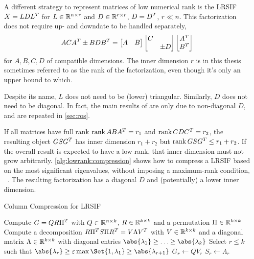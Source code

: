A different strategy to represent matrices of low numerical rank is the \ac{LRSIF} \cite{Benner2009,Lang2015}
$X = LDL^T$ for $L\in\mathbb{R}^{n\times r}$ and $D\in\mathbb{R}^{r \times r}$, $D=D^T$, $r\ll n$.
This factorization does not require up- and downdate to be handled separately,
\begin{equation}
  ACA^T \pm BDB^T =
  \begin{bmatrix}
    A & B
  \end{bmatrix}
  \begin{bmatrix}
    C \\ & \pm D
  \end{bmatrix}
  \begin{bmatrix}
    A^T \\ B^T
  \end{bmatrix}
\end{equation}
for $A, B, C, D$ of compatible dimensions.
The inner dimension $r$ is in this thesis sometimes referred to as the rank of the factorization,
even though it's only an upper bound to which.

\begin{remark}
  Despite its name, $L$ does not need to be (lower) triangular.
  Similarly, $D$ does not need to be diagonal.
  In fact, the main results of \cite{Lang2015} are only due to non-diagonal $D$,
  and are repeated in \autoref{sec:ros}.
\end{remark}

If all matrices have full rank $\operatorname{rank} ABA^T = r_1$ and $\operatorname{rank} CDC^T = r_2$,
the resulting object $GSG^T$ has inner dimension $r_1 + r_2$ but $\operatorname{rank} GSG^T \leq r_1 + r_2$.
If the overall result is expected to have a low rank,
that inner dimension must not grow arbitrarily.
\autoref{alg:lowrank:compression} shows how to compress a \ac{LRSIF}
based on the most significant eigenvalues,
without imposing a maximum-rank condition,
\cf~\cite[Section~6.3.3]{Lang2017}.
The resulting factorization has a diagonal $D$ and (potentially) a lower inner dimension.

\begin{algorithm}[h]
  \caption{Column Compression for LRSIF}
  \label{alg:lowrank:compression}
  Compute $G=QR\Pi^T$ with $Q\in\mathbb{R}^{n\times k}$, $R\in\mathbb{R}^{k\times k}$ and a permutation $\Pi\in\mathbb{R}^{k\times k}$\;
  Compute a decomposition $R \Pi^T S \Pi R^T = V \Lambda V^T$ with $V \in \mathbb{R}^{k\times k}$
  and a diagonal matrix $\Lambda\in\mathbb{R}^{k\times k}$ with diagonal entries $\abs{\lambda_1}\geq\ldots\geq\abs{\lambda_k}$\;
  Select $r \leq k$ such that $\abs{\lambda_r} \geq \epsilon\max\Set{1, \lambda_1} \geq \abs{\lambda_{r+1}}$\;
  $G_r \gets Q V_r$\;
  $S_r \gets \Lambda_r$\;
\end{algorithm}

